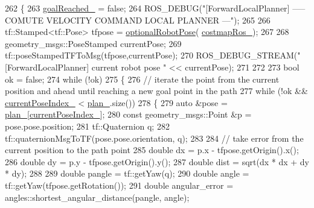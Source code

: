 \begin{DoxyCode}
262 \{
263     \hyperlink{classcl__move__base__z_1_1forward__local__planner_1_1ForwardLocalPlanner_a9d51ad6f0eb364ebd830526280bdf4fc}{goalReached\_} = \textcolor{keyword}{false};
264     ROS\_DEBUG(\textcolor{stringliteral}{"[ForwardLocalPlanner] ----- COMUTE VELOCITY COMMAND LOCAL PLANNER ---"});
265 
266     tf::Stamped<tf::Pose> tfpose = \hyperlink{namespacecl__move__base__z_1_1forward__local__planner_a4c20f9fe0ca67779c53e90182baf4997}{optionalRobotPose}(
      \hyperlink{classcl__move__base__z_1_1forward__local__planner_1_1ForwardLocalPlanner_a37791fea67ce92c6e38e3727311e533b}{costmapRos\_});
267 
268     geometry\_msgs::PoseStamped currentPose;
269     tf::poseStampedTFToMsg(tfpose,currentPose);
270     ROS\_DEBUG\_STREAM(\textcolor{stringliteral}{"[ForwardLocalPlanner] current robot pose "} << currentPose);
271 
272 
273     \textcolor{keywordtype}{bool} ok = \textcolor{keyword}{false};
274     \textcolor{keywordflow}{while} (!ok)
275     \{
276         \textcolor{comment}{// iterate the point from the current position and ahead until reaching a new goal point in the
       path}
277         \textcolor{keywordflow}{while} (!ok && \hyperlink{classcl__move__base__z_1_1forward__local__planner_1_1ForwardLocalPlanner_af4019077a7661d10957cca16222547c2}{currentPoseIndex\_} < \hyperlink{classcl__move__base__z_1_1forward__local__planner_1_1ForwardLocalPlanner_a929e5d0a9db3027810beb658a2343560}{plan\_}.size())
278         \{
279             \textcolor{keyword}{auto} &pose = \hyperlink{classcl__move__base__z_1_1forward__local__planner_1_1ForwardLocalPlanner_a929e5d0a9db3027810beb658a2343560}{plan\_}[\hyperlink{classcl__move__base__z_1_1forward__local__planner_1_1ForwardLocalPlanner_af4019077a7661d10957cca16222547c2}{currentPoseIndex\_}];
280             \textcolor{keyword}{const} geometry\_msgs::Point &p = pose.pose.position;
281             tf::Quaternion q;
282             tf::quaternionMsgToTF(pose.pose.orientation, q);
283 
284             \textcolor{comment}{// take error from the current position to the path point}
285             \textcolor{keywordtype}{double} dx = p.x - tfpose.getOrigin().x();
286             \textcolor{keywordtype}{double} dy = p.y - tfpose.getOrigin().y();
287             \textcolor{keywordtype}{double} dist = sqrt(dx * dx + dy * dy);
288 
289             \textcolor{keywordtype}{double} pangle = tf::getYaw(q);
290             \textcolor{keywordtype}{double} angle = tf::getYaw(tfpose.getRotation());
291             \textcolor{keywordtype}{double} angular\_error = angles::shortest\_angular\_distance(pangle, angle);

\end{DoxyCode}
